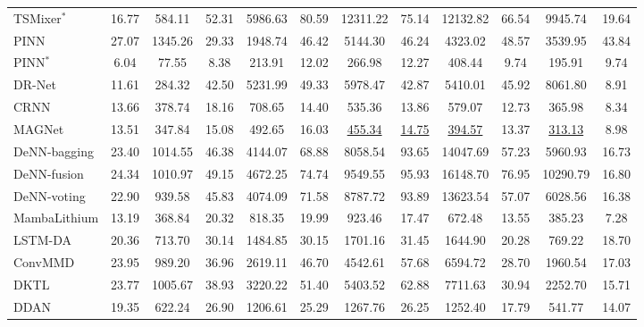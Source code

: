 \documentclass[UTF8,lettersize,journal]{IEEEtran}
\begin{document}
\begin{table}[htbp]
{\begin{adjustbox}{center}
{\begin{threeparttable}
\begin{tabular}{lccccccccccc}
        TSMixer$^\ast$ \cite{chen2023tsmixer} & 16.77  & 584.11  & 52.31  & 5986.63  & 80.59  & 12311.22  & 75.14  & 12132.82  & 66.54  & 9945.74  & 19.64  \\
        PINN \cite{wang2024physics}  & 27.07  & 1345.26  & 29.33  & 1948.74  & 46.42  & 5144.30  & 46.24  & 4323.02  & 48.57  & 3539.95  & 43.84  \\
        PINN$^\ast$ \cite{wang2024physics} & 6.04  & 77.55  & 8.38  & 213.91  & 12.02  & 266.98  & 12.27  & 408.44  & 9.74  & 195.91  & 9.74  \\
        DR-Net \cite{WANG2023108897} & 11.61  & 284.32  & 42.50  & 5231.99  & 49.33  & 5978.47  & 42.87  & 5410.01  & 45.92  & 8061.80  & 8.91  \\
        CRNN \cite{D2EE01676A}  & 13.66  & 378.74  & 18.16  & 708.65  & 14.40  & 535.36  & 13.86  & 579.07  & 12.73  & 365.98  & 8.34  \\
        MAGNet \cite{TAN2024103725} & 13.51  & 347.84  & 15.08  & 492.65  & 16.03  & \underline{455.34}  & \underline{14.75}  & \underline{394.57}  & 13.37  & \underline{313.13}  & 8.98  \\
        DeNN-bagging \cite{10102497} & 23.40  & 1014.55  & 46.38  & 4144.07  & 68.88  & 8058.54  & 93.65  & 14047.69  & 57.23  & 5960.93  & 16.73  \\
        DeNN-fusion \cite{10102497} & 24.34  & 1010.97  & 49.15  & 4672.25  & 74.74  & 9549.55  & 95.93  & 16148.70  & 76.95  & 10290.79  & 16.80  \\
        DeNN-voting \cite{10102497} & 22.90  & 939.58  & 45.83  & 4074.09  & 71.58  & 8787.72  & 93.89  & 13623.54  & 57.07  & 6028.56  & 16.38  \\
        MambaLithium \cite{shi2024mambalithiumselectivestatespace} & 13.19  & 368.84  & 20.32  & 818.35  & 19.99  & 923.46  & 17.47  & 672.48  & 13.55  & 385.23  & 7.28  \\
        LSTM-DA \cite{HAN2022230823} & 20.36  & 713.70  & 30.14  & 1484.85  & 30.15  & 1701.16  & 31.45  & 1644.90  & 20.28  & 769.22  & 18.70  \\
        ConvMMD \cite{9788003} & 23.95  & 989.20  & 36.96  & 2619.11  & 46.70  & 4542.61  & 57.68  & 6594.72  & 28.70  & 1960.54  & 17.03  \\
        DKTL \cite{10029904}  & 23.77  & 1005.67  & 38.93  & 3220.22  & 51.40  & 5403.52  & 62.88  & 7711.63  & 30.94  & 2252.70  & 15.71  \\
        DDAN \cite{9560040}  & 19.35  & 622.24  & 26.90  & 1206.61  & 25.29  & 1267.76  & 26.25  & 1252.40  & 17.79  & 541.77  & 14.07  \\

\end{tabular}
\end{threeparttable}}
\end{adjustbox}}
\end{table}
\end{document}
